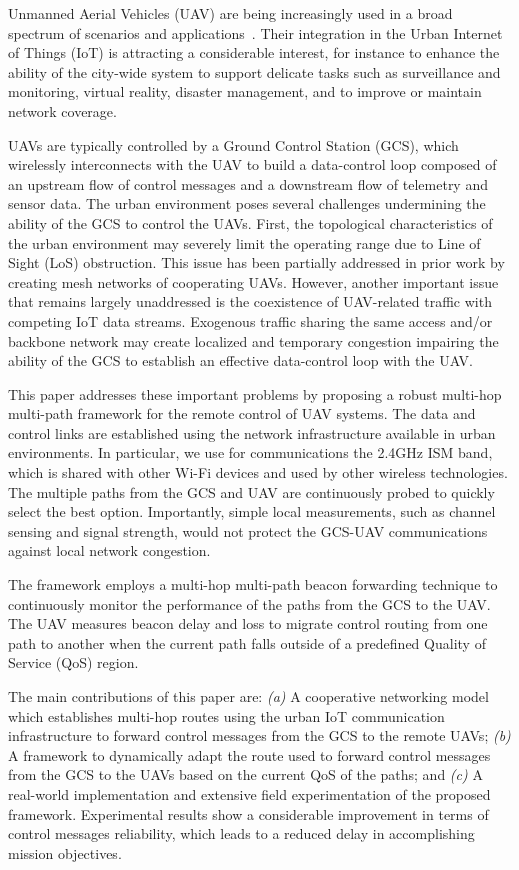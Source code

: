 Unmanned Aerial Vehicles (UAV) are being increasingly used in a broad spectrum of scenarios and applications~\cite{rodrigues2017uav}.
Their integration in the Urban Internet of Things (IoT) is attracting a considerable interest, for instance to enhance the ability of the city-wide system to support delicate tasks such as surveillance and monitoring, virtual reality, disaster management, and to improve or maintain network coverage.

UAVs are typically controlled by a Ground Control Station (GCS), which wirelessly interconnects with the UAV to build a data-control loop composed of an upstream flow of control messages and a downstream flow of telemetry and sensor data. The urban environment poses several challenges undermining the ability of the GCS to control the UAVs.
First, the topological characteristics of the urban environment may severely limit the operating range due to Line of Sight (LoS) obstruction. This issue has been partially addressed in prior work by creating mesh networks of cooperating UAVs.
However, another important issue that remains largely unaddressed is the coexistence of UAV-related traffic with competing IoT data streams. Exogenous traffic sharing the same access and/or backbone network may create localized and temporary congestion impairing the ability of the GCS to establish an effective data-control loop with the UAV.

This paper addresses these important problems by proposing a robust multi-hop multi-path framework for the remote control of UAV systems. The data and control links are established using the network infrastructure available in urban environments. In particular, we use for communications the 2.4GHz ISM band, which is shared with other Wi-Fi devices and used by other wireless technologies. The multiple paths from the GCS and UAV are continuously probed to quickly select the best option. Importantly, simple local measurements, such as channel sensing and signal strength, would not protect the GCS-UAV communications against local network congestion.

The framework employs a multi-hop multi-path beacon forwarding technique to continuously monitor the performance of the paths from the GCS to the UAV. The UAV measures beacon delay and loss to migrate control routing from one path to another when the current path falls outside of a predefined Quality of Service (QoS) region.

The main contributions of this paper are:
\emph{(a)} A cooperative networking model which establishes multi-hop routes using the urban IoT communication infrastructure to forward control messages from the GCS to the remote UAVs;
\emph{(b)} A framework to dynamically adapt the route used to forward control messages from the GCS to the UAVs based on the current QoS of the paths; and \emph{(c)} A real-world implementation and extensive field experimentation of the proposed framework.
Experimental results show a considerable improvement in terms of control messages reliability, which leads to a reduced delay in accomplishing mission objectives.

